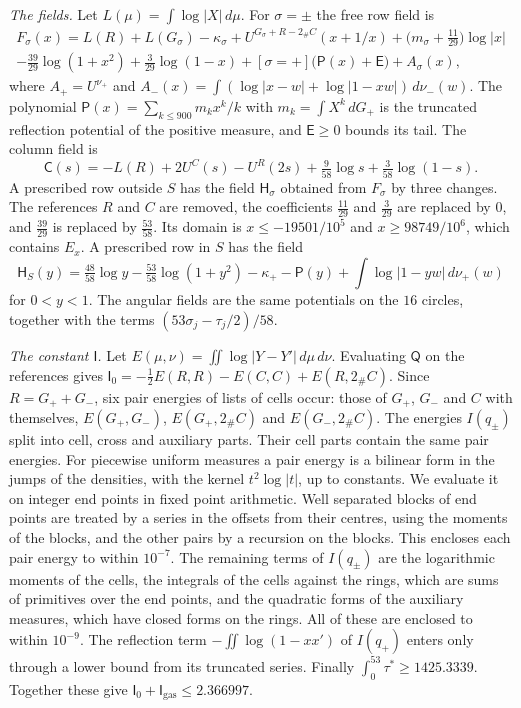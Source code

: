 \documentclass[11pt]{amsart}
\theoremstyle{definition}
\theoremstyle{remark}
\numberwithin{equation}{section}
\begin{document}
\emph{The fields.} Let $L(\mu)=\int\log|X|\,d\mu$. For $\sigma=\pm$ the free row field is
\begin{multline*}
 F_\sigma(x)=L(R)+L(G_\sigma)-\kappa_\sigma+U^{G_\sigma+R-2_\#C}(x+1/x)+\bigl(m_\sigma+\tfrac{11}{29}\bigr)\log|x|\\
 -\tfrac{39}{29}\log(1+x^2)+\tfrac3{29}\log(1-x)+[\sigma=+]\bigl(\mathsf P(x)+\mathsf E\bigr)+A_\sigma(x),
\end{multline*}
where $A_+=U^{\nu_+}$ and $A_-(x)=\int(\log|x-w|+\log|1-xw|)\,d\nu_-(w)$. The polynomial $\mathsf P(x)=\sum_{k\le900}m_kx^k/k$ with $m_k=\int X^k\,dG_+$ is
the truncated reflection potential of the positive measure, and $\mathsf E\ge0$ bounds its tail.
The column field is
\[
 \mathsf C(s)=-L(R)+2U^C(s)-U^R(2s)+\tfrac9{58}\log s+\tfrac3{58}\log(1-s).
\]
A prescribed row outside $S$ has the field $\mathsf H_\sigma$ obtained from $F_\sigma$ by three changes. The references $R$ and $C$ are removed, the
coefficients $\frac{11}{29}$ and $\frac3{29}$ are replaced by $0$, and $\frac{39}{29}$ is replaced by $\frac{53}{58}$. Its domain is
$x\le-19501/10^5$ and $x\ge98749/10^6$, which contains $E_x$. A prescribed row in $S$ has the field
\[
 \mathsf H_S(y)=\tfrac{48}{58}\log y-\tfrac{53}{58}\log(1+y^2)-\kappa_+-\mathsf P(y)+\int\log|1-yw|\,d\nu_+(w)
\]
for $0<y<1$.
The angular fields are the same potentials on the $16$ circles, together with the terms $(53\sigma_j-\tau_j/2)/58$.

\emph{The constant $\mathsf I$.} Let $E(\mu,\nu)=\iint\log|Y-Y'|\,d\mu\,d\nu$. Evaluating $\mathsf Q$ on the references gives $\mathsf I_0=-\frac12E(R,R)-E(C,C)+E(R,2_\#C)$. Since $R=G_++G_-$, six pair
energies of lists of cells occur: those of $G_+$, $G_-$ and $C$ with themselves, $E(G_+,G_-)$, $E(G_+,2_\#C)$ and $E(G_-,2_\#C)$. The energies $I(q_\pm)$ split into cell, cross and auxiliary parts. Their cell parts contain the same
pair energies. For piecewise uniform measures a pair energy is a bilinear form in the jumps of the densities, with the kernel $t^2\log|t|$, up to constants. We evaluate it on integer end points in fixed point arithmetic. Well separated blocks of end points are
treated by a series in the offsets from their centres, using the moments of the blocks, and the other pairs by a recursion on the blocks. This encloses each pair energy to within $10^{-7}$. The remaining terms of $I(q_\pm)$ are the logarithmic moments of the cells,
the integrals of the cells against the rings, which are sums of primitives over the end points, and the quadratic forms of the auxiliary measures, which have closed forms on the rings. All of these are enclosed to within $10^{-9}$. The reflection term $-\iint\log(1-xx')$ of $I(q_+)$
enters only through a lower bound from its truncated series. Finally $\int_0^{53}\tau^*\ge1425.3339$. Together these give $\mathsf I_0+\mathsf I_{\mathrm{gas}}\le2.366997$.
\end{document}
